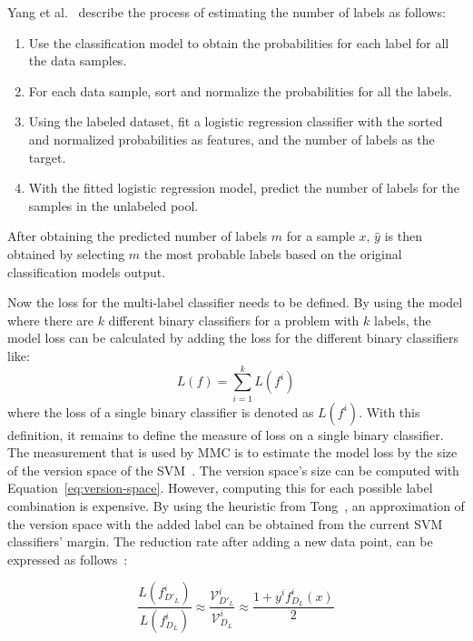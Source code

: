 Yang et al\@.~\cite{yang2009effective} describe the process of estimating the number of labels as follows:
\begin{enumerate}
    \item Use the classification model to obtain the probabilities for each label for all the data samples.
    \item For each data sample, sort and normalize the probabilities for all the labels.
    \item Using the labeled dataset, fit a logistic regression classifier with the sorted and normalized probabilities as features, and the number of labels as the target.
    \item With the fitted logistic regression model, predict the number of labels for the samples in the unlabeled pool.
\end{enumerate}

After obtaining the predicted number of labels $m$ for a sample $x$, $\hat{y}$ is then obtained by selecting $m$ the most probable labels based on the original classification models output.

Now the loss for the multi-label classifier needs to be defined.
By using the model where there are $k$ different binary classifiers for a problem with $k$ labels, the model loss can be calculated by adding the loss for the different binary classifiers like:
\begin{equation}
    L(f) = \sum_{i = 1}^k L(f^i)
\end{equation}
where the loss of a single binary classifier is denoted as $L(f^i)$.
With this definition, it remains to define the measure of loss on a single binary classifier.
The measurement that is used by MMC is to estimate the model loss by the size of the version space of the SVM~\cite{tong2001support, yang2009effective}.
The version space's size can be computed with Equation~\ref{eq:version-space}.
However, computing this for each possible label combination is expensive.
By using the heuristic from Tong~\cite{tong2001active}, an approximation of the version space with the added label can be obtained from the current SVM classifiers' margin.
The reduction rate after adding a new data point, can be expressed as follows~\cite{yang2009effective, tong2001active}:

\begin{equation}\label{eq:reduction-rate}
    \frac{L(f^i_{D'_L})}{L(f^i_{D_L})} \approx \frac{\mathcal{V}^i_{D'_L}}{\mathcal{V}^i_{D_L}} \approx \frac{1 + y^i f^i_{D_L}(x)}{2}
\end{equation}

